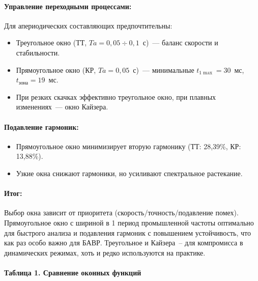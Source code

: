 \paragraph{Управление переходными процессами:}
Для апериодических составляющих предпочтительны:
\begin{itemize}[noitemsep,topsep=2pt]
\item Треугольное окно (ТТ, $Ta=0{,}05 \div 0{,}1$~с)~--- баланс скорости и стабильности.
\item Прямоугольное окно (КР, $Ta=0{,}05$~с)~--- минимальные $t_{1\max}=30$~мс, $t_{\text{зона}}=19$~мс.
\item При резких скачках эффективно треугольное окно, при плавных изменениях~--- окно Кайзера.
\end{itemize}

\paragraph{Подавление гармоник:}
\begin{itemize}[noitemsep,topsep=2pt]
\item Прямоугольное окно минимизирует вторую гармонику (ТТ: 28,39\%, КР: 13,88\%).
\item Узкие окна снижают гармоники, но усиливают спектральное растекание.
\end{itemize}

\paragraph{Итог:} Выбор окна зависит от приоритета (скорость/точность/подавление помех). Прямоугольное окно с шириной в 1 период промышленной частоты оптимально для быстрого анализа и подавления гармоник с повышением устойчивость, что как раз особо важно для БАВР. Треугольное и Кайзера~-- для компромисса в динамических режимах, хоть и редко используются на практике.

\paragraph{Таблица 1. Сравнение оконных функций}
\label{tab:ch02_window_functions}


